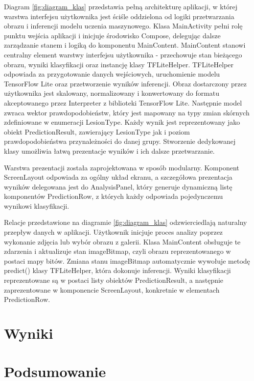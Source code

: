 Diagram \ref{fig:diagram_klas} przedstawia pełną architekturę aplikacji, w której warstwa interfejsu użytkownika jest ściśle oddzielona od logiki przetwarzania obrazu i inferencji modelu uczenia maszynowego.
Klasa MainActivity pełni rolę punktu wejścia aplikacji i inicjuje środowisko Compose, delegując dalsze zarządzanie stanem i logiką do komponentu MainContent.
MainContent stanowi centralny element warstwy interfejsu użytkownika - przechowuje stan bieżącego obrazu, wyniki klasyfikacji oraz instancję klasy TFLiteHelper.
TFLiteHelper odpowiada za przygotowanie danych wejściowych, uruchomienie modelu TensorFlow Lite oraz przetworzenie wyników inferencji.
Obraz dostarczony przez użytkownika jest skalowany, normalizowany i konwertowany do formatu akceptowanego przez Interpreter z biblioteki TensorFlow Lite.
Następnie model zwraca wektor prawdopodobieństw, który jest mapowany na typy zmian skórnych zdefiniowane w enumeracji LesionType.
Każdy wynik jest reprezentowany jako obiekt PredictionResult, zawierający LesionType jak i poziom prawdopodobieństwa przynależności do danej grupy.
Stworzenie dedykowanej klasy umożliwia łatwą prezentacje wyników i ich dalsze przetwarzanie.

Warstwa prezentacji została zaprojektowana w sposób modularny. 
Komponent ScreenLayout odpowiada za ogólny układ ekranu, a szczegółowa prezentacja wyników delegowana jest do AnalysisPanel, który generuje dynamiczną listę komponentów PredictionRow, z których każdy odpowiada pojedynczemu wynikowi klasyfikacji.

Relacje przedstawione na diagramie \ref{fig:diagram_klas} odzwierciedlają naturalny przepływ danych w aplikacji.
Użytkownik inicjuje proces analizy poprzez wykonanie zdjęcia lub wybór obrazu z galerii.
Klasa MainContent obsługuje te zdarzenia i aktualizuje stan imageBitmap, czyli obrazu reprezentowanego w postaci mapy bitów.
Zmiana stanu imageBitmap automatycznie wywołuje metodę predict() klasy TFLiteHelper, która dokonuje inferencji.
Wyniki klasyfikacji reprezentowane są w postaci listy obiektów PredictionResult, a następnie zaprezentowane w komponencie ScreenLayout, konkretnie w elementach PredictionRow.


\section{Wyniki}


\section{Podsumowanie}